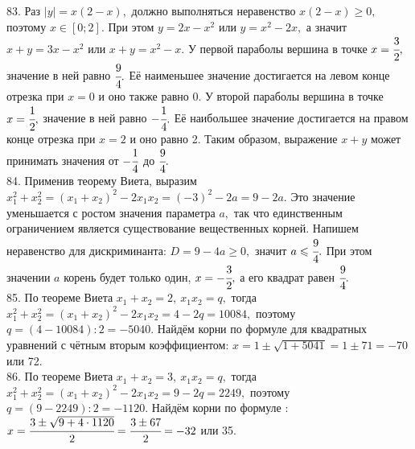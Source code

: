 83.  Раз $|y|=x(2-x),$ должно выполняться неравенство $x(2-x)\geqslant0,$ поэтому $x\in[0;2].$ При этом $y=2x-x^2$ или $y=x^2-2x,$ а значит $x+y=3x-x^2$ или $x+y=x^2-x.$ У первой параболы вершина в точке $x=\cfrac{3}{2},$ значение в ней равно $\cfrac{9}{4}.$ Её наименьшее значение достигается на левом конце отрезка при $x=0$ и оно также равно 0. У второй параболы вершина в точке $x=\cfrac{1}{2},$ значение в ней равно $-\cfrac{1}{4}.$ Её наибольшее значение достигается на правом конце отрезка при $x=2$ и оно равно 2. Таким образом, выражение $x+y$ может принимать значения от $-\cfrac{1}{4}$ до $\cfrac{9}{4}.$\\
84. Применив теорему Виета, выразим $x_1^2+x_2^2=(x_1+x_2)^2-2x_1x_2=(-3)^2-2a=9-2a.$ Это значение уменьшается с ростом значения параметра $a,$ так что единственным ограничением является существование вещественных корней. Напишем неравенство для дискриминанта: $D=9-4a\geqslant0,$ значит $a\leqslant \cfrac{9}{4}.$ При этом значении $a$ корень будет только один, $x=-\cfrac{3}{2},$ а его квадрат равен $\cfrac{9}{4}.$\\
85. По теореме Виета $x_1+x_2=2,\ x_1x_2=q,$ тогда $x_1^2+x_2^2=(x_1+x_2)^2-2x_1x_2=4-2q=10084,$ поэтому $q=(4-10084):2=-5040.$ Найдём корни по формуле для квадратных уравнений с чётным вторым коэффициентом: $x=1\pm\sqrt{1+5041}=1\pm71=-70$ или 72.\\
86. По теореме Виета $x_1+x_2=3,\ x_1x_2=q,$ тогда $x_1^2+x_2^2=(x_1+x_2)^2-2x_1x_2=9-2q=2249,$ поэтому $q=(9-2249):2=-1120.$ Найдём корни по формуле : $x=\cfrac{3\pm\sqrt{9+4\cdot1120}}{2}=\cfrac{3\pm67}{2}=-32$ или 35.\\
